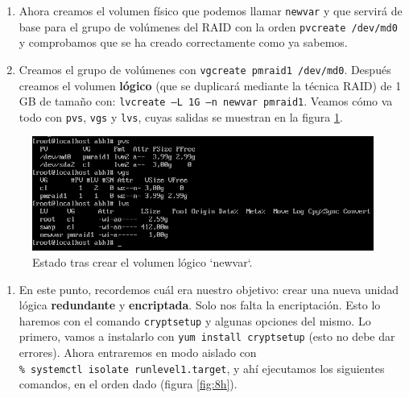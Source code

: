 \documentclass[
]{memoir}
\providecommand{\tightlist}{%
  \setlength{\itemsep}{0pt}\setlength{\parskip}{0pt}}
\begin{document}
\begin{enumerate}
\def\labelenumi{\arabic{enumi}.}
\setcounter{enumi}{6}
\tightlist
\item
  Ahora creamos el volumen físico que podemos llamar \texttt{newvar} y que servirá de base para el grupo de volúmenes del RAID con la orden \texttt{pvcreate\ /dev/md0} y comprobamos que se ha creado correctamente como ya sabemos.
\item
  Creamos el grupo de volúmenes con \texttt{vgcreate\ pmraid1\ /dev/md0}. Después creamos el volumen \textbf{lógico} (que se duplicará mediante la técnica RAID) de 1 GB de tamaño con: \texttt{lvcreate\ –L\ 1G\ –n\ newvar\ pmraid1}. Veamos cómo va todo con \texttt{pvs}, \texttt{vgs} y \texttt{lvs}, cuyas salidas se muestran en la figura \ref{fig:7h}.
\end{enumerate}

\begin{figure}

{\centering \includegraphics[width=0.95\linewidth]{images/7} 

}

\caption{Estado tras crear el volumen lógico `newvar`.}\label{fig:7h}
\end{figure}

\begin{enumerate}
\def\labelenumi{\arabic{enumi}.}
\setcounter{enumi}{8}
\tightlist
\item
  En este punto, recordemos cuál era nuestro objetivo: crear una nueva unidad lógica \textbf{redundante} y \textbf{encriptada}. Solo nos falta la encriptación. Esto lo haremos con el comando \texttt{cryptsetup} y algunas opciones del mismo. Lo primero, vamos a instalarlo con \texttt{yum\ install\ cryptsetup} (esto no debe dar errores). Ahora entraremos en modo aislado con \texttt{\%\ systemctl\ isolate\ runlevel1.target}, y ahí ejecutamos los siguientes comandos, en el orden dado (figura \ref{fig:8h}).
\end{enumerate}
\end{document}
